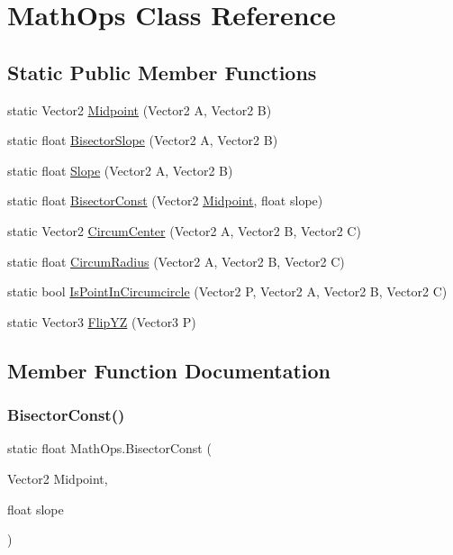 \hypertarget{class_math_ops}{}\section{Math\+Ops Class Reference}
\label{class_math_ops}
\subsection*{Static Public Member Functions}
\begin{DoxyCompactItemize}
\item 
static Vector2 \mbox{\hyperlink{class_math_ops_a375da2b95a7a9cc75dd9413e2f6521d1}{Midpoint}} (Vector2 A, Vector2 B)
\item 
static float \mbox{\hyperlink{class_math_ops_a8143187da9ccc8eb4d7e2e6d89f2008b}{Bisector\+Slope}} (Vector2 A, Vector2 B)
\item 
static float \mbox{\hyperlink{class_math_ops_af1a2e97f206740e26a569a07a663de7d}{Slope}} (Vector2 A, Vector2 B)
\item 
static float \mbox{\hyperlink{class_math_ops_a5eb232eb24001f54d3ff3d3dc19adf3c}{Bisector\+Const}} (Vector2 \mbox{\hyperlink{class_math_ops_a375da2b95a7a9cc75dd9413e2f6521d1}{Midpoint}}, float slope)
\item 
static Vector2 \mbox{\hyperlink{class_math_ops_aac4861e44cbbf5c8e3f8e7aee06d5ed0}{Circum\+Center}} (Vector2 A, Vector2 B, Vector2 C)
\item 
static float \mbox{\hyperlink{class_math_ops_a79f3f44aa12a5804b6e6ff7874c62cbd}{Circum\+Radius}} (Vector2 A, Vector2 B, Vector2 C)
\item 
static bool \mbox{\hyperlink{class_math_ops_a8add15f1367d790bc4ba29331a72bd32}{Is\+Point\+In\+Circumcircle}} (Vector2 P, Vector2 A, Vector2 B, Vector2 C)
\item 
static Vector3 \mbox{\hyperlink{class_math_ops_ab1c0982b962841b8e0e0505a30032091}{Flip\+YZ}} (Vector3 P)
\end{DoxyCompactItemize}


\subsection{Member Function Documentation}
\mbox{\label{class_math_ops_a5eb232eb24001f54d3ff3d3dc19adf3c}} 
\subsubsection{\texorpdfstring{Bisector\+Const()}{BisectorConst()}}
{\footnotesize\ttfamily static float Math\+Ops.\+Bisector\+Const (\begin{DoxyParamCaption}\item[{Vector2}]{Midpoint,  }\item[{float}]{slope }\end{DoxyParamCaption})\hspace{0.3cm}{\ttfamily [static]}}

